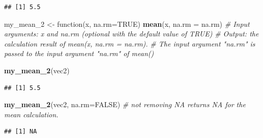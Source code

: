 \documentclass[]{book}
\newenvironment{Shaded}{\begin{snugshade}}{\end{snugshade}}
\newcommand{\KeywordTok}[1]{\textcolor[rgb]{0.13,0.29,0.53}{\textbf{{#1}}}}
\newcommand{\DataTypeTok}[1]{\textcolor[rgb]{0.13,0.29,0.53}{{#1}}}
\newcommand{\DecValTok}[1]{\textcolor[rgb]{0.00,0.00,0.81}{{#1}}}
\newcommand{\StringTok}[1]{\textcolor[rgb]{0.31,0.60,0.02}{{#1}}}
\newcommand{\CommentTok}[1]{\textcolor[rgb]{0.56,0.35,0.01}{\textit{{#1}}}}
\newcommand{\OtherTok}[1]{\textcolor[rgb]{0.56,0.35,0.01}{{#1}}}
\newcommand{\NormalTok}[1]{{#1}}
\theoremstyle{definition}
\theoremstyle{definition}
\theoremstyle{remark}
\begin{document}
\begin{verbatim}
## [1] 5.5
\end{verbatim}

\begin{Shaded}
\begin{Highlighting}[]
\NormalTok{my_mean_2 <-}\StringTok{ }\NormalTok{function(x, }\DataTypeTok{na.rm=}\OtherTok{TRUE}\NormalTok{)  }\KeywordTok{mean}\NormalTok{(x, }\DataTypeTok{na.rm =} \NormalTok{na.rm)   }
  \CommentTok{# Input arguments: x and na.rm (optional with the default value of TRUE) }
  \CommentTok{# Output: the calculation result of mean(x, na.rm = na.rm).}
  \CommentTok{# The input argument "na.rm" is passed to the input argument "na.rm" of mean() }

\KeywordTok{my_mean_2}\NormalTok{(vec2)}
\end{Highlighting}
\end{Shaded}

\begin{verbatim}
## [1] 5.5
\end{verbatim}

\begin{Shaded}
\begin{Highlighting}[]
\KeywordTok{my_mean_2}\NormalTok{(vec2, }\DataTypeTok{na.rm=}\OtherTok{FALSE}\NormalTok{)  }\CommentTok{# not removing NA returns NA for the mean calculation.  }
\end{Highlighting}
\end{Shaded}

\begin{verbatim}
## [1] NA
\end{verbatim}

\begin{Shaded}
\end{Shaded}
\end{document}
